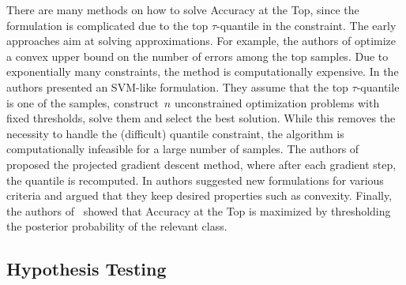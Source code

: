 There are many methods on how to solve Accuracy at the Top, since the formulation is complicated due to the top $\tau$-quantile in the constraint. The early approaches aim at solving approximations. For example, the authors of \cite{joachims2005svm} optimize a convex upper bound on the number of errors among the top samples. Due to exponentially many constraints, the method is computationally expensive. In \cite{boyd2012accuracy} the authors presented an SVM-like formulation. They assume that the top $\tau$-quantile is one of the samples, construct~$n$ unconstrained optimization problems with fixed thresholds, solve them and select the best solution. While this removes the necessity to handle the (difficult) quantile constraint, the algorithm is computationally infeasible for a large number of samples. The authors of~\cite{grill2016learning} proposed the projected gradient descent method, where after each gradient step, the quantile is recomputed. In \cite{eban2017scalable} authors suggested new formulations for various criteria and argued that they keep desired properties such as convexity. Finally, the authors of~\cite{tasche2018plug} showed that Accuracy at the Top is maximized by thresholding the posterior probability of the relevant class.

\subsection{Hypothesis Testing}

